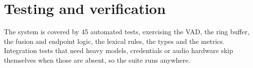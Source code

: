 \section{Testing and verification}
\label{sec:testing}

The system is covered by 45 automated tests, exercising the VAD, the ring buffer, the fusion
and endpoint logic, the lexical rules, the types and the metrics. Integration tests that
need heavy models, credentials or audio hardware skip themselves when those are absent, so
the suite runs anywhere. 
